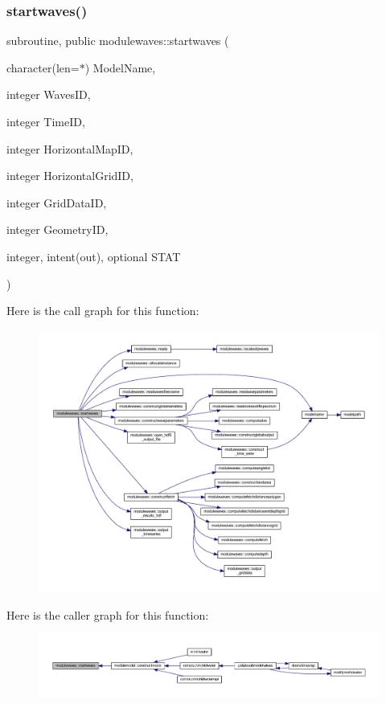 \subsubsection{\texorpdfstring{startwaves()}{startwaves()}}
{\footnotesize\ttfamily subroutine, public modulewaves\+::startwaves (\begin{DoxyParamCaption}\item[{character(len=$\ast$)}]{Model\+Name,  }\item[{integer}]{Waves\+ID,  }\item[{integer}]{Time\+ID,  }\item[{integer}]{Horizontal\+Map\+ID,  }\item[{integer}]{Horizontal\+Grid\+ID,  }\item[{integer}]{Grid\+Data\+ID,  }\item[{integer}]{Geometry\+ID,  }\item[{integer, intent(out), optional}]{S\+T\+AT }\end{DoxyParamCaption})}

Here is the call graph for this function\+:\nopagebreak
\begin{figure}[H]
\begin{center}
\leavevmode
\includegraphics[width=350pt]{namespacemodulewaves_afb65a1617589473a3eac08eef0cc3a2b_cgraph}
\end{center}
\end{figure}
Here is the caller graph for this function\+:\nopagebreak
\begin{figure}[H]
\begin{center}
\leavevmode
\includegraphics[width=350pt]{namespacemodulewaves_afb65a1617589473a3eac08eef0cc3a2b_icgraph}
\end{center}
\end{figure}
\mbox{\label{namespacemodulewaves_a0c5557cca037fc7fe0c05098f278075d}} 
